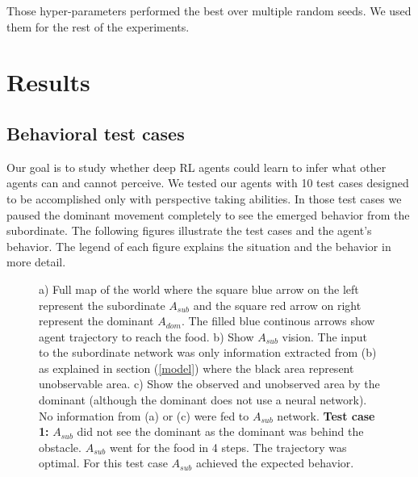 \documentclass{article}
\begin{document}
Those hyper-parameters performed the best over multiple random seeds. We used them for the rest of the experiments.

\section{Results}

\subsection{Behavioral test cases}
Our goal is to study whether deep RL agents could learn to infer what other agents can and cannot perceive. We tested our agents with 10 test cases designed to be accomplished only with perspective taking abilities. In those test cases we paused the dominant movement completely to see the emerged behavior from the subordinate. The following figures illustrate the test cases and the agent's behavior. The legend of each figure explains the situation and the behavior in more detail.

\begin{figure}[H]
    \centering
    \caption{a) Full map of the world where the square blue arrow on the left represent the subordinate \(A_{sub}\) and the square red arrow on right represent the dominant \(A_{dom}\).  The filled blue continous arrows show agent trajectory to reach the food. b) Show \(A_{sub}\) vision. The input to the subordinate network was only information extracted from (b) as explained in section (\ref{model}) where the black area represent unobservable area. c) Show the observed and unobserved area by the dominant (although the dominant does not use a neural network). No information from (a) or (c) were fed to \(A_{sub}\) network. \textbf {Test  case 1:} \(A_{sub}\) did not see the dominant as the dominant was behind the obstacle. \(A_{sub}\) went for the food in 4 steps. The trajectory was optimal.  For this test case \(A_{sub}\) achieved the expected behavior.}
    \label{fig.tc.1}
\end{figure}
\end{document}
